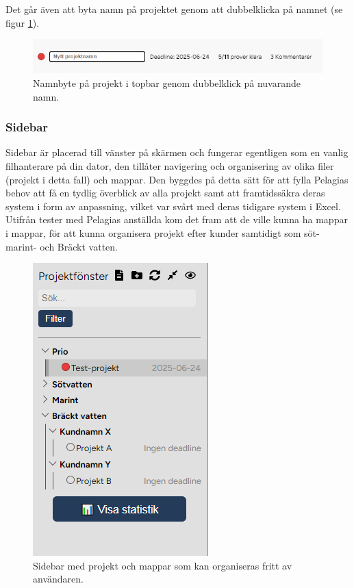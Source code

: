 \noindent Det går även att byta namn på projektet genom att dubbelklicka på namnet (se figur \ref{fig:topbar_nytt_namn}). 

\begin{figure}[H]
    \centering
    \includegraphics[width=0.8\linewidth]{images/topbar_nytt_namn.PNG}
    \caption{Namnbyte på projekt i topbar genom dubbelklick på nuvarande namn.}
    \label{fig:topbar_nytt_namn}
\end{figure}

\subsubsection{Sidebar}
Sidebar är placerad till vänster på skärmen och fungerar egentligen som en vanlig filhanterare på din dator, den tillåter navigering och organisering av olika filer (projekt i detta fall) och mappar.
Den byggdes på detta sätt för att fylla Pelagias behov att få en tydlig överblick av alla projekt samt att framtidssäkra deras system i form av anpassning,
vilket var svårt med deras tidigare system i Excel. Utifrån tester med Pelagias anställda kom det fram att de ville kunna ha mappar i mappar, för att kunna organisera projekt efter kunder samtidigt som söt- marint- och Bräckt vatten.

\begin{figure}[H]
    \centering
    \includegraphics[width=0.5\linewidth]{images/sidebar2.png}
    \caption{Sidebar med projekt och mappar som kan organiseras fritt av användaren.}
    \label{fig:sidebar}
\end{figure}

